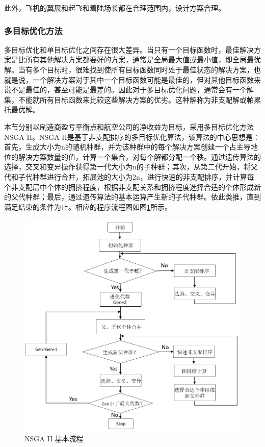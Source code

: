 \documentclass[12pt,a4paper]{report}
\begin{document}
此外，飞机的翼展和起飞和着陆场长都在合理范围内，设计方案合理。

\subsubsection{多目标优化方法}
多目标优化和单目标优化之间存在很大差异。当只有一个目标函数时，最佳解决方案是比所有其他解决方案都要好的方案，通常是全局最大值或最小值，即全局最优解。当有多个目标时，很难找到使所有目标函数同时处于最佳状态的解决方案，也就是说，一个解决方案对于其中一个目标函数可能是最佳的，但对其他目标函数来说不是最佳的，甚至可能是最差的。因此对于多目标优化问题，通常会有一个解集，不能就所有目标函数来比较这些解决方案的优劣。这种解称为非支配解或帕累托最优解。

本节分别以制造商盈亏平衡点和航空公司的净收益为目标，采用多目标优化方法NSGA II\cite{Gao2006NSGA}。NSGA-II是基于非支配排序的多目标优化算法，该算法的中心思想是：首先，生成大小为n的随机种群，并为该种群中的每个解决方案创建一个占主导地位的解决方案数量的值，计算一个集合，对每个解都分配一个秩。通过遗传算法的选择，交叉和变异操作获得第一代大小为n的子种群；其次，从第二代开始，将父代和子代种群进行合并，拓展池的大小为2n，进行快速的非支配排序，并计算每个非支配层中个体的拥挤程度，根据非支配关系和拥挤程度选择合适的个体形成新的父代种群；最后，通过遗传算法的基本运算产生新的子代种群。依此类推，直到满足结束的条件为止。相应的程序流程图如图\ref{fig:NSGA}所示。
\begin{figure}[htp]
    \centering
   \includegraphics[width=.8\textwidth]{eps/NSGAII.jpg}
    \caption{NSGA II 基本流程\cite{Gao2006NSGA}}
    \label{fig:NSGA}
\end{figure}
\end{document}
